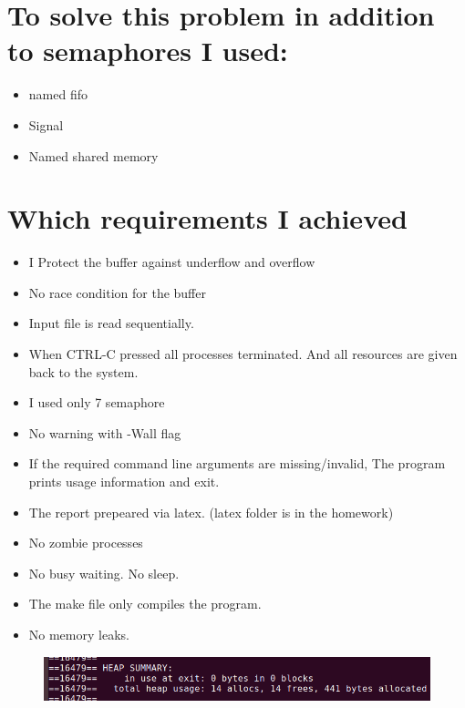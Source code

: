 \documentclass[10pt,english, openany]{book}
\begin{document}
\section{To solve this problem in addition to semaphores I used:}

\begin{itemize}
  \item named fifo
  \item Signal
  \item Named shared memory
\end{itemize}
\section{Which requirements I achieved}

\begin{itemize}
  \item I Protect the buffer against underflow and overflow
  \item No race condition for the buffer
  \item Input file is read sequentially.
  \item When CTRL-C pressed all processes terminated. And all resources are given back to the system.
  \item I used only 7 semaphore
  \item No warning with -Wall flag
  \item If the required command line arguments are missing/invalid, The program prints usage information and exit.
  \item The report prepeared via latex. (latex folder is in the homework)
  \item No zombie processes
  \item No busy waiting. No sleep.
  \item The make file only compiles the program.
  \item No memory leaks.
\end{itemize}


\begin{figure}[htp]
    \centering
    \includegraphics[width=18cm]{no-leak.png}
    
\end{figure}
\end{document}
